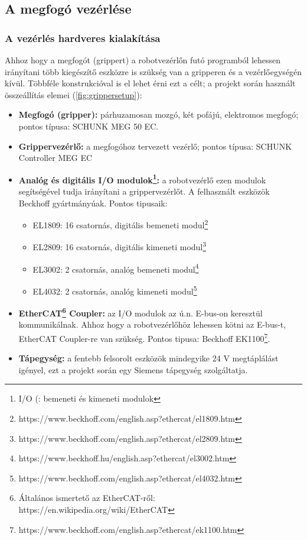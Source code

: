 \documentclass[../documentation.tex]{subfiles}
\begin{document}
\subsection{A megfogó vezérlése}
\subsubsection{A vezérlés hardveres kialakítása}
Ahhoz hogy a megfogót (grippert) a robotvezérlőn futó programból lehessen irányítani több kiegészítő eszközre is szükség van a gripperen és a vezérlőegységén kívül. Többféle konstrukcióval is el lehet érni ezt a célt; a projekt során használt összeállítás elemei (\ref{fig:grippersetup}):
\begin{itemize}
	\item \textbf{Megfogó (gripper):} párhuzamosan mozgó, két pofájú, elektromos megfogó; pontos típusa: SCHUNK MEG 50 EC\cite{grippermanual}.
	\item \textbf{Grippervezérlő:} a megfogóhoz tervezett vezérlő; pontos típusa: SCHUNK Controller MEG EC\cite{grippermanual}
	\item \textbf{Analóg és digitális I/O modulok\footnote{I/O (: bemeneti és kimeneti modulok}:} a robotvezérlő ezen modulok segítségével tudja irányítani a grippervezérlőt. A felhasznált eszközök Beckhoff gyártmányúak. Pontos tipusaik:
	\begin{itemize}
		\item EL1809: 16 csatornás, digitális bemeneti modul\footnote{https://www.beckhoff.com/english.asp?ethercat/el1809.htm}
		\item EL2809: 16 csatornás, digitális kimeneti modul\footnote{https://www.beckhoff.com/english.asp?ethercat/el2809.htm}
		\item EL3002: 2 csatornás, analóg bemeneti modul\footnote{https://www.beckhoff.hu/english.asp?ethercat/el3002.htm}
		\item EL4032: 2 csatornás, analóg kimeneti modul\footnote{https://www.beckhoff.com/english.asp?ethercat/el4032.htm}
	\end{itemize}
	\item \textbf{EtherCAT\footnote{Általános ismertető az EtherCAT-ről: https://en.wikipedia.org/wiki/EtherCAT} Coupler:} az I/O modulok az ú.n. E-bus-on keresztül kommunikálnak. Ahhoz hogy a robotvezérlőhöz lehessen kötni az E-bus-t, EtherCAT Coupler-re van szükség. Pontos tipusa: Beckhoff EK1100\footnote{https://www.beckhoff.com/english.asp?ethercat/ek1100.htm}.
	\item \textbf{Tápegység:} a fentebb felsorolt eszközök mindegyike 24 V megtáplálást igényel, ezt a projekt során egy Siemens tápegység szolgáltatja.
\end{itemize}
\end{document}
